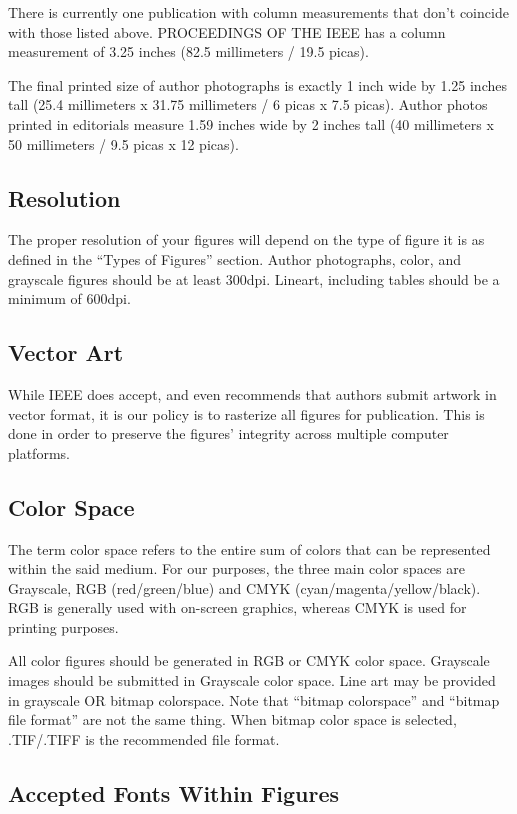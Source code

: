 \documentclass[journal]{IEEEtranTIE}
\begin{document}
There is currently one publication with column measurements that don't coincide with those listed above. PROCEEDINGS OF THE IEEE has a column measurement of 3.25 inches (82.5 millimeters / 19.5 picas).

The final printed size of author photographs is exactly
1 inch wide by 1.25 inches tall (25.4 millimeters x 31.75 millimeters / 6 picas x 7.5 picas). Author photos printed in editorials measure 1.59 inches wide by 2 inches tall (40 millimeters  x 50 millimeters  / 9.5 picas x 12 picas).


\subsection{Resolution}

The proper resolution of your figures will depend on the type of figure it is as defined in the ``Types of Figures'' section. Author photographs, color, and grayscale figures should be at least 300dpi. Lineart, including tables should be a minimum of 600dpi.


\subsection{Vector Art}

While IEEE does accept, and even recommends that authors submit artwork in vector format, it is our policy is to rasterize all figures for publication. This is done in order to preserve the figures' integrity across multiple computer platforms.


\subsection{Color Space}

The term color space refers to the entire sum of colors that can be represented within the said medium. For our purposes, the three main color spaces are Grayscale, RGB (red/green/blue) and CMYK (cyan/magenta/yellow/black). RGB is generally used with on-screen graphics, whereas CMYK is used for printing purposes.

All color figures should be generated in RGB or CMYK color space. Grayscale images should be submitted in Grayscale color space. Line art may be provided in grayscale OR bitmap colorspace. Note that ``bitmap colorspace'' and ``bitmap file format'' are not the same thing. When bitmap color space is selected, .TIF/.TIFF is the recommended file format.


\subsection{Accepted Fonts Within Figures}
\end{document}
